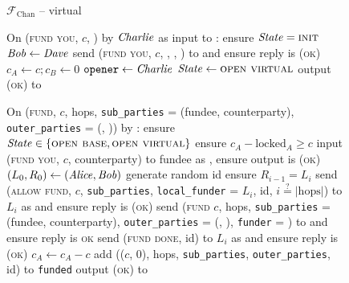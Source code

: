 \begin{figure}[H]
  \begin{systembox}{$\mathcal{F}_{\mathrm{Chan}}$ -- virtual}
    \begin{algorithmic}[1]
      \State On (\textsc{fund you}, $c$, \dave) by $\mathit{Charlie}$ as input to
      \alice: 
      \Indent
        \State ensure $\mathit{State} = \textsc{init}$
        \State $\mathit{Bob} \gets \mathit{Dave}$
        \State send (\textsc{fund you}, $c$, \bob, \charlie, \alice) to
        \adversary and ensure reply is \textsc{(ok)}
        \State $c_A \gets c; c_B \gets 0$
        \State $\mathtt{opener} \gets \mathit{Charlie}$
        \State $\mathit{State} \gets \textsc{open virtual}$
        \State output (\textsc{ok}) to \charlie
      \EndIndent
      \Statex

      \State On (\textsc{fund}, $c$, hops, \texttt{sub\_parties} = (fundee,
      counterparty), \texttt{outer\_parties} = (\charlie, \dave)) by \alice:
      \label{code:functionality:chan:skeleton:virtual:fund}
      \Indent
        \State ensure $\mathit{State} \in \{\textsc{open base}, \textsc{open
        virtual}\}$
        \State ensure $c_A - \mathrm{locked}_A \geq c$
        \State input (\textsc{fund you}, $c$, counterparty) to fundee as \alice,
        ensure output is (\textsc{ok})
        \State $(L_0, R_0) \gets (\mathit{Alice}, \mathit{Bob})$
        \State generate random id
         
          \State ensure $R_{i-1} = L_i$
          \State send (\textsc{allow fund}, $c$, \texttt{sub\_parties},
          \texttt{local\_funder} = $L_i$, id, $i \overset{?}{=} |\mathrm{hops}|$)
          to $L_i$ as \alice and ensure reply is (\textsc{ok})
        \EndFor
        \State send (\textsc{fund} $c$, hops, \texttt{sub\_parties} = (fundee,
        counterparty), \texttt{outer\_parties} = (\charlie, \dave),
        \texttt{funder} = \alice) to \adversary and ensure reply is \textsc{ok}
         
          \State send (\textsc{fund done}, id) to $L_i$ as \alice and ensure
          reply is (\textsc{ok})
        \EndFor
        \State $c_A \gets c_A - c$
        \State add (($c$, 0), hops, \texttt{sub\_parties},
        \texttt{outer\_parties}, id) to \texttt{funded} 
        \label{code:functionality:chan:skeleton:virtual:fund:store}
        \State output (\textsc{ok}) to \alice
      \EndIndent
      \Statex


\end{algorithmic}
\end{systembox}
\end{figure}
